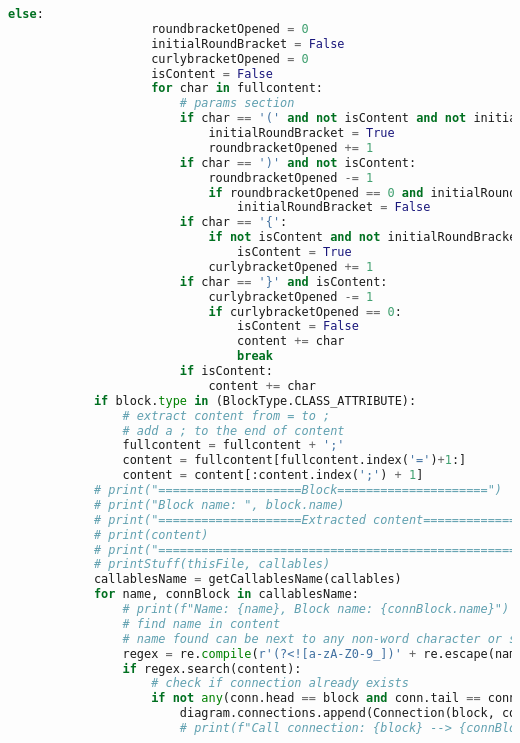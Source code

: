 \begin{lstlisting}[language=Python, caption={$\texttt{CallAnalyzer}$ function.}, label={lst:11}]
                else:
                    roundbracketOpened = 0
                    initialRoundBracket = False
                    curlybracketOpened = 0
                    isContent = False
                    for char in fullcontent:
                        # params section
                        if char == '(' and not isContent and not initialRoundBracket:
                            initialRoundBracket = True
                            roundbracketOpened += 1
                        if char == ')' and not isContent:
                            roundbracketOpened -= 1
                            if roundbracketOpened == 0 and initialRoundBracket:
                                initialRoundBracket = False
                        if char == '{':
                            if not isContent and not initialRoundBracket:
                                isContent = True
                            curlybracketOpened += 1
                        if char == '}' and isContent:
                            curlybracketOpened -= 1
                            if curlybracketOpened == 0:
                                isContent = False
                                content += char
                                break
                        if isContent:
                            content += char
            if block.type in (BlockType.CLASS_ATTRIBUTE):
                # extract content from = to ;
                # add a ; to the end of content
                fullcontent = fullcontent + ';'
                content = fullcontent[fullcontent.index('=')+1:]
                content = content[:content.index(';') + 1]
            # print("====================Block=====================")
            # print("Block name: ", block.name)
            # print("====================Extracted content=====================")
            # print(content)
            # print("==========================================================")
            # printStuff(thisFile, callables)
            callablesName = getCallablesName(callables)
            for name, connBlock in callablesName:
                # print(f"Name: {name}, Block name: {connBlock.name}")
                # find name in content
                # name found can be next to any non-word character or start of line and end of line
                regex = re.compile(r'(?<![a-zA-Z0-9_])' + re.escape(name) + r'(?![a-zA-Z0-9_])')
                if regex.search(content):
                    # check if connection already exists
                    if not any(conn.head == block and conn.tail == connBlock and conn.type == ConnectionType.CALL for conn in diagram.connections):
                        diagram.connections.append(Connection(block, connBlock, ConnectionType.CALL))
                        # print(f"Call connection: {block} --> {connBlock}")
\end{lstlisting}